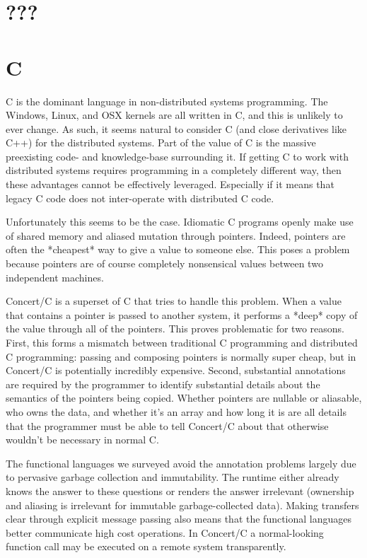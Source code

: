\documentclass[10pt,a4paper,twocolumn]{article}
\begin{document}
\section{???}

\section{C}

C is the dominant language in non-distributed systems programming. The Windows,
Linux, and OSX kernels are all written in C, and this is unlikely to ever
change. As such, it seems natural to consider C (and close derivatives like C++)
for the distributed systems. Part of the value of C is the massive preexisting
code- and knowledge-base surrounding it. If getting C to work with distributed
systems requires programming in a completely different way, then these
advantages cannot be effectively leveraged. Especially if it means that legacy C
code does not inter-operate with distributed C code.

Unfortunately this seems to be the case. Idiomatic C programs openly make use of
shared memory and aliased mutation through pointers. Indeed, pointers are often
the *cheapest* way to give a value to someone else. This poses a problem because
pointers are of course completely nonsensical values between two independent
machines.

Concert/C \cite{auerbach1994concert} is a superset of C that tries to handle
this problem. When a value that contains a pointer is passed to another system,
it performs a *deep* copy of the value through all of the pointers. This proves
problematic for two reasons. First, this forms a mismatch between traditional C
programming and distributed C programming: passing and composing pointers is
normally super cheap, but in Concert/C is potentially incredibly expensive.
Second, substantial annotations are required by the programmer to identify
substantial details about the semantics of the pointers being copied. Whether
pointers are nullable or aliasable, who owns the data, and whether it's an array
and how long it is are all details that the programmer must be able to tell
Concert/C about that otherwise wouldn't be necessary in normal C.

The functional languages we surveyed avoid the annotation problems largely due
to pervasive garbage collection and immutability. The runtime either already
knows the answer to these questions or renders the answer irrelevant (ownership
and aliasing is irrelevant for immutable garbage-collected data). Making
transfers clear through explicit message passing also means that the functional
languages better communicate high cost operations. In Concert/C a normal-looking
function call may be executed on a remote system transparently.
\end{document}
